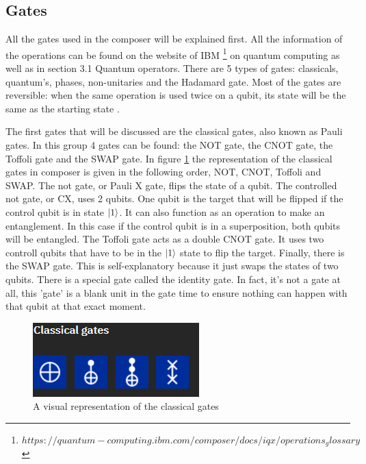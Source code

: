 \subsection{Gates}
\label{subsubsec:gates}
All the gates used in the composer will be explained first. All the information of the operations can be found on the website of IBM \footnote{$https://quantum-computing.ibm.com/composer/docs/iqx/operations_glossary$} on quantum computing as well as in \textcite{Hidary_2019} section 3.1 Quantum operators.
There are 5 types of gates: classicals, quantum's, phases, non-unitaries and the Hadamard gate. Most of the gates are reversible: when the same operation is used twice on a qubit, its state will be the same as the starting state \autocite{reversible_gates, revgates}.

The first gates that will be discussed are the classical gates, also known as Pauli gates. In this group 4 gates can be found: the NOT gate, the CNOT gate, the Toffoli gate and the SWAP gate.
In figure \ref{fig:classical gates} the representation of the classical gates in composer is given in the following order, NOT, CNOT, Toffoli and SWAP.
The not gate, or Pauli X gate, flips the state of a qubit. The controlled not gate, or CX, uses 2 qubits. One qubit is the target that will be flipped if the control qubit is in state $\ket{1}$. It can also function as an operation to make an entanglement.
In this case if the control qubit is in a superposition, both qubits will be entangled. The Toffoli gate acts as a double CNOT gate. It uses two controll qubits that have to be in the $\ket{1}$ state to flip the target.
Finally, there is the SWAP gate. This is self-explanatory because it just swaps the states of two qubits. There is a special gate called the identity gate. In fact, it's not a gate at all, this 'gate' is a blank unit in the gate time to ensure nothing can happen with that qubit at that exact moment.

\begin{figure} [h]
    \centering
    \includegraphics[width=\textwidth]{img/classical-gates.PNG}
        \caption{A visual representation of the classical gates \autocite{imggates}}
        \label{fig:classical gates}
\end{figure}


